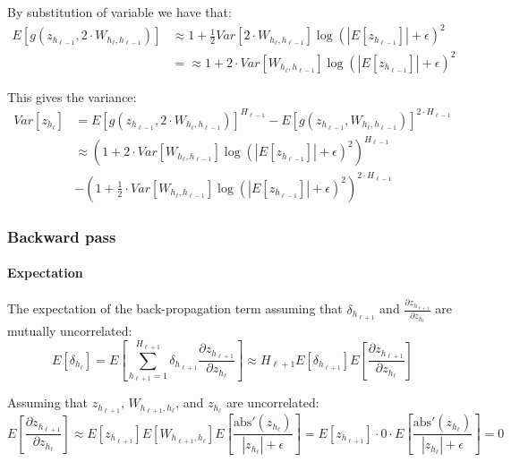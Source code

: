 By substitution of variable we have that:
\begin{equation}
\begin{aligned}
E\left[g(z_{h_{\ell-1}}, 2 \cdot W_{h_{\ell}, h_{\ell-1}})\right] &\approx 1 + \frac{1}{2} Var[2 \cdot W_{h_{\ell}, h_{\ell-1}}] \log(|E[z_{h_{\ell-1}}]| + \epsilon)^2 \\
&= \approx 1 + 2 \cdot Var[W_{h_{\ell}, h_{\ell-1}}] \log(|E[z_{h_{\ell-1}}]| + \epsilon)^2
\end{aligned}
\end{equation}

This gives the variance:
\begin{equation}
\begin{aligned}
Var[z_{h_\ell}] &= E\left[g(z_{h_{\ell-1}}, 2 \cdot W_{h_{\ell}, h_{\ell-1}}) \right]^{H_{\ell-1}}
- E\left[g(z_{h_{\ell-1}}, W_{h_{\ell}, h_{\ell-1}})\right]^{2\cdot H_{\ell-1}} \\
&\approx \left(1 + 2 \cdot Var[W_{h_{\ell}, h_{\ell-1}}] \log(|E[z_{h_{\ell-1}}]| + \epsilon)^2\right)^{H_{\ell-1}} \\
&- \left(1 + \frac{1}{2} \cdot Var[W_{h_{\ell}, h_{\ell-1}}] \log(|E[z_{h_{\ell-1}}]| + \epsilon)^2\right)^{2\cdot H_{\ell-1}}
\end{aligned}
\end{equation}

\subsubsection{Backward pass}

\paragraph{Expectation} The expectation of the back-propagation term assuming that $\delta_{h_{\ell+1}}$ and $\frac{\partial z_{h_{\ell+1}}}{\partial z_{h_\ell}}$ are mutually uncorrelated:
\begin{equation}
E[\delta_{h_\ell}] = E\left[\sum_{h_{\ell+1}=1}^{H_{\ell+1}} \delta_{h_{\ell+1}} \frac{\partial z_{h_{\ell+1}}}{\partial z_{h_\ell}}\right] \approx H_{\ell+1} E[\delta_{h_{\ell+1}}] E\left[\frac{\partial z_{h_{\ell+1}}}{\partial z_{h_\ell}}\right]
\end{equation}

Assuming that $z_{h_{\ell+1}}$, $W_{h_{\ell+1},h_\ell}$, and $z_{h_\ell}$ are uncorrelated:
\begin{equation}
E\left[\frac{\partial z_{h_{\ell+1}}}{\partial z_{h_\ell}}\right] \approx E[{z_{h_{\ell+1}}}] E[W_{h_{\ell+1}, h_{\ell}}] E\left[ \frac{\mathrm{abs}'(z_{h_{\ell}})}{|z_{h_{\ell}}| + \epsilon}\right] = E[z_{h_{\ell+1}}] \cdot 0 \cdot E\left[ \frac{\mathrm{abs}'(z_{h_{\ell}})}{|z_{h_\ell}| + \epsilon}\right] = 0
\end{equation}

